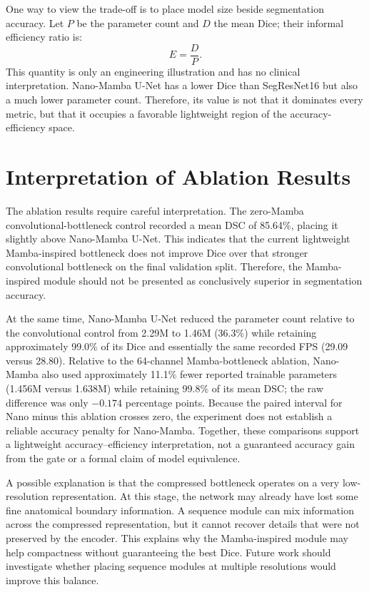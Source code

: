 One way to view the trade-off is to place model size beside segmentation accuracy. Let $P$ be the parameter count and $D$ the mean Dice; their informal efficiency ratio is:
\begin{equation}
    E = \frac{D}{P}.
\end{equation}
This quantity is only an engineering illustration and has no clinical interpretation. Nano-Mamba U-Net has a lower Dice than SegResNet16 but also a much lower parameter count. Therefore, its value is not that it dominates every metric, but that it occupies a favorable lightweight region of the accuracy-efficiency space.

\section{Interpretation of Ablation Results}
The ablation results require careful interpretation. The zero-Mamba convolutional-bottleneck control recorded a mean DSC of 85.64\%, placing it slightly above Nano-Mamba U-Net. This indicates that the current lightweight Mamba-inspired bottleneck does not improve Dice over that stronger convolutional bottleneck on the final validation split. Therefore, the Mamba-inspired module should not be presented as conclusively superior in segmentation accuracy.

At the same time, Nano-Mamba U-Net reduced the parameter count relative to the convolutional control from 2.29M to 1.46M (36.3\%) while retaining approximately 99.0\% of its Dice and essentially the same recorded FPS (29.09 versus 28.80). Relative to the 64-channel Mamba-bottleneck ablation, Nano-Mamba also used approximately 11.1\% fewer reported trainable parameters (1.456M versus 1.638M) while retaining 99.8\% of its mean DSC; the raw difference was only $-0.174$ percentage points. Because the paired interval for Nano minus this ablation crosses zero, the experiment does not establish a reliable accuracy penalty for Nano-Mamba. Together, these comparisons support a lightweight accuracy--efficiency interpretation, not a guaranteed accuracy gain from the gate or a formal claim of model equivalence.

A possible explanation is that the compressed bottleneck operates on a very low-resolution representation. At this stage, the network may already have lost some fine anatomical boundary information. A sequence module can mix information across the compressed representation, but it cannot recover details that were not preserved by the encoder. This explains why the Mamba-inspired module may help compactness without guaranteeing the best Dice. Future work should investigate whether placing sequence modules at multiple resolutions would improve this balance.

